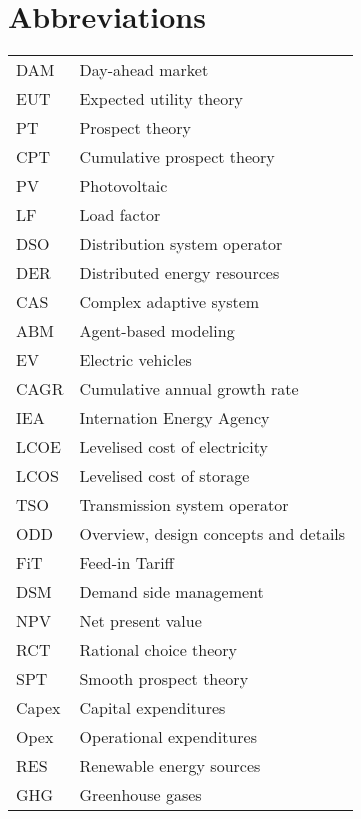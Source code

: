 \documentclass[master=ene,english]{kulemt}
\begin{document}
\section*{Abbreviations}
\begin{flushleft}
  \renewcommand{\arraystretch}{1.1}
  \begin{tabularx}{\textwidth}{@{}p{12mm}X@{}}
    DAM   & Day-ahead market \\
    EUT   & Expected utility theory \\
    PT  & Prospect theory \\
    CPT  & Cumulative prospect theory \\
    PV  & Photovoltaic \\
    LF  & Load factor \\
    DSO & Distribution system operator\\
    DER & Distributed energy resources\\
    CAS & Complex adaptive system\\
    ABM & Agent-based modeling\\
    EV & Electric vehicles\\
    CAGR & Cumulative annual growth rate\\
    IEA & Internation Energy Agency\\
    LCOE & Levelised cost of electricity\\
    LCOS & Levelised cost of storage\\
    TSO & Transmission system operator\\
    ODD & Overview, design concepts and details\\
    FiT & Feed-in Tariff\\
    DSM & Demand side management\\
    NPV & Net present value\\
    RCT & Rational choice theory\\
    SPT & Smooth prospect theory\\
    Capex & Capital expenditures\\
    Opex & Operational expenditures\\
    RES & Renewable energy sources\\    
    GHG & Greenhouse gases\\
  \end{tabularx}
\end{flushleft}
\end{document}
